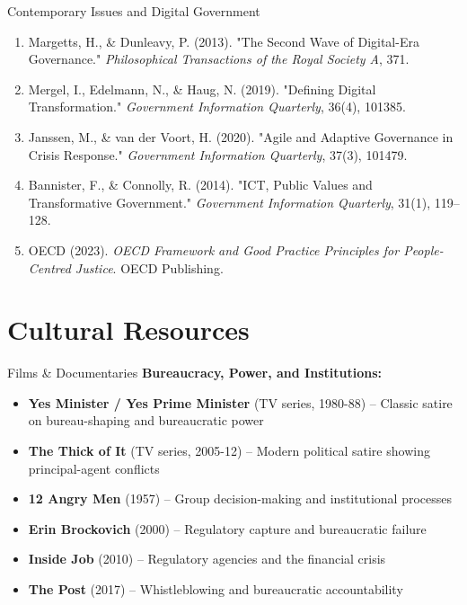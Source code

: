 \documentclass[10pt]{beamer}
\begin{document}
\begin{frame}{Contemporary Issues and Digital Government}
\footnotesize
\begin{enumerate}
\item Margetts, H., \& Dunleavy, P. (2013). "The Second Wave of Digital-Era Governance." \emph{Philosophical Transactions of the Royal Society A}, 371.
\item Mergel, I., Edelmann, N., \& Haug, N. (2019). "Defining Digital Transformation." \emph{Government Information Quarterly}, 36(4), 101385.
\item Janssen, M., \& van der Voort, H. (2020). "Agile and Adaptive Governance in Crisis Response." \emph{Government Information Quarterly}, 37(3), 101479.
\item Bannister, F., \& Connolly, R. (2014). "ICT, Public Values and Transformative Government." \emph{Government Information Quarterly}, 31(1), 119–128.
\item OECD (2023). \emph{OECD Framework and Good Practice Principles for People-Centred Justice}. OECD Publishing.
\end{enumerate}
\end{frame}


\section*{Cultural Resources}

\begin{frame}{Films \& Documentaries}
\textbf{Bureaucracy, Power, and Institutions:}
\begin{itemize}
\item \textbf{Yes Minister / Yes Prime Minister} (TV series, 1980-88) – Classic satire on bureau-shaping and bureaucratic power
\item \textbf{The Thick of It} (TV series, 2005-12) – Modern political satire showing principal-agent conflicts
\item \textbf{12 Angry Men} (1957) – Group decision-making and institutional processes
\item \textbf{Erin Brockovich} (2000) – Regulatory capture and bureaucratic failure
\item \textbf{Inside Job} (2010) – Regulatory agencies and the financial crisis
\item \textbf{The Post} (2017) – Whistleblowing and bureaucratic accountability
\end{itemize}
\end{frame}
\end{document}
